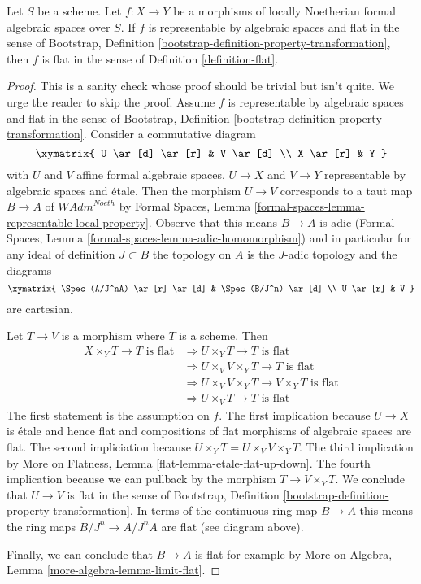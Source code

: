 \begin{lemma}
\label{lemma-representable-flat}
Let $S$ be a scheme. Let $f : X \to Y$ be a morphisms of
locally Noetherian formal algebraic spaces over $S$.
If $f$ is representable by algebraic spaces and
flat in the sense of Bootstrap, Definition
\ref{bootstrap-definition-property-transformation},
then $f$ is flat in the sense of Definition \ref{definition-flat}.
\end{lemma}

\begin{proof}
This is a sanity check whose proof should be trivial but isn't quite.
We urge the reader to skip the proof.
Assume $f$ is representable by algebraic spaces and
flat in the sense of Bootstrap, Definition
\ref{bootstrap-definition-property-transformation}.
Consider a commutative diagram
$$
\xymatrix{
U \ar[d] \ar[r] & V \ar[d] \\
X \ar[r] & Y
}
$$
with $U$ and $V$ affine formal algebraic spaces, $U \to X$ and $V \to Y$
representable by algebraic spaces and \'etale.
Then the morphism $U \to V$
corresponds to a taut map $B \to A$ of $\textit{WAdm}^{Noeth}$ by
Formal Spaces, Lemma
\ref{formal-spaces-lemma-representable-local-property}.
Observe that this means $B \to A$ is adic (Formal Spaces, Lemma
\ref{formal-spaces-lemma-adic-homomorphism})
and in particular for any ideal of definition $J \subset B$
the topology on $A$ is the $J$-adic topology and the diagrams
$$
\xymatrix{
\Spec(A/J^nA) \ar[r] \ar[d] & \Spec(B/J^n) \ar[d] \\
U \ar[r] & V
}
$$
are cartesian.

\medskip\noindent
Let $T \to V$ is a morphism where $T$ is a scheme. Then
\begin{align*}
X \times_Y T \to T\text{ is flat}
& \Rightarrow
U \times_Y T \to T\text{ is flat} \\
& \Rightarrow
U \times_V V \times_Y T \to T\text{ is flat} \\
& \Rightarrow
U \times_V V \times_Y T \to V \times_Y T\text{ is flat} \\
& \Rightarrow
U \times_V T \to T\text{ is flat}
\end{align*}
The first statement is the assumption on $f$.
The first implication because $U \to X$ is \'etale and hence flat
and compositions of flat morphisms of algebraic spaces are flat.
The second impliciation because $U \times_Y T = U \times_V V \times_Y T$.
The third implication by
More on Flatness, Lemma \ref{flat-lemma-etale-flat-up-down}.
The fourth implication because we can pullback by the morphism
$T \to V \times_Y T$.
We conclude that $U \to V$ is flat in the sense of
Bootstrap, Definition
\ref{bootstrap-definition-property-transformation}.
In terms of the continuous ring map $B \to A$
this means the ring maps $B/J^n \to A/J^nA$ are flat (see diagram above).

\medskip\noindent
Finally, we can conclude that $B \to A$ is flat for example
by More on Algebra, Lemma \ref{more-algebra-lemma-limit-flat}.
\end{proof}
